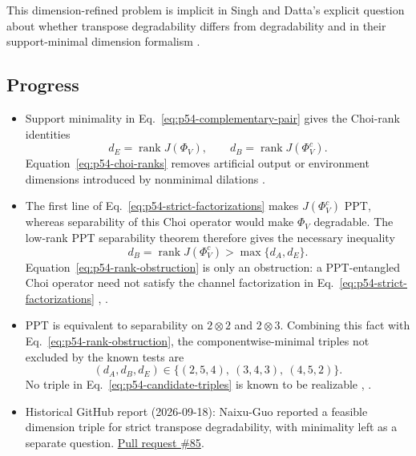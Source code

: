 This dimension-refined problem is implicit in Singh and Datta's explicit
question about whether transpose degradability differs from degradability and
in their support-minimal dimension formalism
.

\subsection*{Progress}

\begin{itemize}
  \item Support minimality in Eq.~\eqref{eq:p54-complementary-pair} gives the
  Choi-rank identities
  \begin{equation}
    d_E=\operatorname{rank}J(\Phi_V),
    \qquad
    d_B=\operatorname{rank}J(\Phi_V^c).
    \label{eq:p54-choi-ranks}
  \end{equation}
  Equation~\eqref{eq:p54-choi-ranks} removes artificial output or environment
  dimensions introduced by nonminimal dilations
  .

  \item The first line of Eq.~\eqref{eq:p54-strict-factorizations} makes
  $J(\Phi_V^c)$ PPT, whereas separability of this Choi operator would make
  $\Phi_V$ degradable.  The low-rank PPT separability theorem therefore gives
  the necessary inequality
  \begin{equation}
    d_B=\operatorname{rank}J(\Phi_V^c)
      >\max\{d_A,d_E\}.
    \label{eq:p54-rank-obstruction}
  \end{equation}
  Equation~\eqref{eq:p54-rank-obstruction} is only an obstruction: a
  PPT-entangled Choi operator need not satisfy the channel factorization in
  Eq.~\eqref{eq:p54-strict-factorizations}
  ,
  .

  \item PPT is equivalent to separability on $2\otimes2$ and $2\otimes3$.
  Combining this fact with Eq.~\eqref{eq:p54-rank-obstruction}, the
  componentwise-minimal triples not excluded by the known tests are
  \begin{equation}
    (d_A,d_B,d_E)\in
      \{(2,5,4),\ (3,4,3),\ (4,5,2)\}.
    \label{eq:p54-candidate-triples}
  \end{equation}
  No triple in Eq.~\eqref{eq:p54-candidate-triples} is known to be realizable
  ,
  .

  \item Historical GitHub report (2026-09-18): Naixu-Guo reported a feasible dimension triple for strict transpose degradability, with minimality left as a separate question. \href{https://github.com/Naixu-Guo/quantum-open-problems/pull/85}{Pull request \#85}.
\end{itemize}

